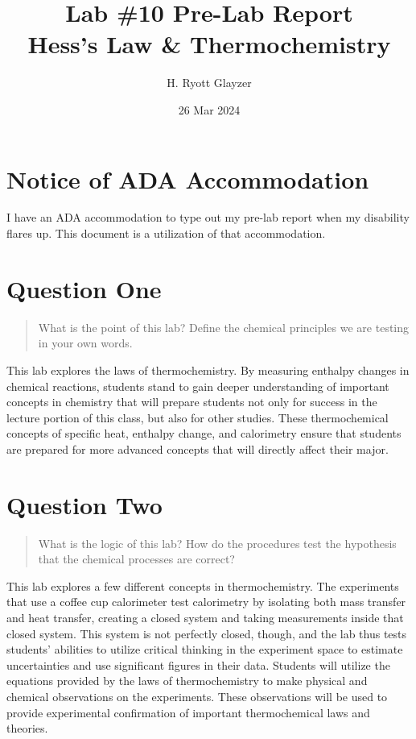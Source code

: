 \documentclass[11pt, letterpaper]{article}
\begin{document}


\title{Lab \#10 Pre-Lab Report \\ \large Hess's Law \& Thermochemistry}
\author{H. Ryott Glayzer}
\date{26 Mar 2024}


\maketitle


\section*{Notice of ADA Accommodation}
I have an ADA accommodation to type out my pre-lab report when my disability flares up.
This document is a utilization of that accommodation.

\section{Question One}
\begin{quote}
    What is the point of this lab? Define the chemical principles we are testing in your own words.
\end{quote}
This lab explores the laws of thermochemistry. By measuring enthalpy changes in chemical reactions,
students stand to gain deeper understanding of important concepts in chemistry that will prepare
students not only for success in the lecture portion of this class, but also for other studies.
These thermochemical concepts of specific heat, enthalpy change, and calorimetry ensure that
students are prepared for more advanced concepts that will directly affect their major.

\section{Question Two}
\begin{quote}
    What is the logic of this lab? How do the procedures test the hypothesis that the chemical 
    processes are correct?
\end{quote}
This lab explores a few different concepts in thermochemistry.
The experiments that use a coffee cup calorimeter test calorimetry
by isolating both mass transfer and heat transfer, creating a closed system
and taking measurements inside that closed system.
This system is not perfectly closed, though, and the lab thus tests students' 
abilities to utilize critical thinking in the experiment space to estimate
uncertainties and use significant figures in their data.
Students will utilize the equations provided by the laws of thermochemistry to
make physical and chemical observations on the experiments.
These observations will be used to provide experimental confirmation of important
thermochemical laws and theories.
\end{document}
